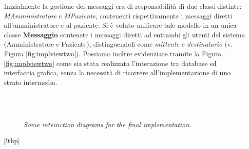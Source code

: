 Inizialmente la gestione dei messaggi era di responsabilità di due
classi distinte: \emph{MAmministratore} e \emph{MPaziente}, contenenti
rispettivamente i messaggi diretti all'amministratore e al paziente.
Si è voluto unificare tale modello in un unica classe \textbf{Messaggio}
contenete i messaggi diretti ad entrambi gli utenti del sistema (Amministratore
e Paziente), distinguendoli come \emph{mittente} e \emph{destinatario} (v.
Figura \vref{fig:implviewtwo}). Possiamo inoltre
evidenziare tramite la Figura \vref{fig:implviewtwo}
come sia stata realizzata l'interazione tra database ed interfaccia grafica,
senza la necessità di ricorrere all'implementazione di uno strato intermedio.

\begin{figure}[!thp]
	\centering
	\\
	\\
	\caption{\it{Some interaction diagrams for the final implementation}.}
	\label{fig:implviewtre}
\end{figure}[!thp]
